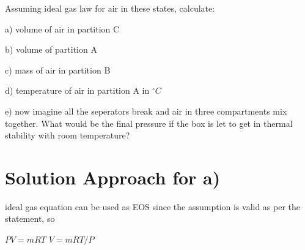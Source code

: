 \documentclass[letterpaper,10pt,english]{jupyterBook}
\begin{document}
\sphinxAtStartPar
Assuming ideal gas law for air in these states, calculate:

\sphinxAtStartPar
a) volume of air in partition C

\sphinxAtStartPar
b) volume of partition A

\sphinxAtStartPar
c) mass of air in partition B

\sphinxAtStartPar
d) temperature of air in partition A in \(^{\circ}  C\)

\sphinxAtStartPar
e) now imagine all the seperators break and air in three compartments mix together. What would be the final pressure if the box is let to get in thermal stability with room temperature?


\section{Solution Approach for a)}
\label{\detokenize{notebooks/Chapter3/CH3-Q2_v1:solution-approach-for-a}}
\sphinxAtStartPar
ideal gas equation can be used as EOS since the assumption is valid as per the statement, so

\sphinxAtStartPar
\(PV=mRT\) 
\(V=mRT/P\)
\end{document}
